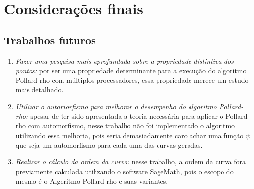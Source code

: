 \chapter{Considerações finais}

\section{Trabalhos futuros}

\begin{enumerate}
	\item \textit{Fazer uma pesquisa mais aprofundada sobre a propriedade distintiva dos pontos:} por ser uma propriedade determinante para a execução do algoritmo Pollard-rho com múltiplos processadores, essa propriedade merece um estudo mais detalhado.
	\item \textit{Utilizar o automorfismo para melhorar o desempenho do algoritmo Pollard-rho:} apesar de ter sido apresentada a teoria necessária para aplicar o Pollard-rho com automorfismo, nesse trabalho não foi implementado o algoritmo utilizando essa melhoria, pois seria demasiadamente caro achar uma função $\psi$ que seja um automorfismo para cada uma das curvas geradas.
	\item \textit{Realizar o cálculo da ordem da curva:} nesse trabalho, a ordem da curva fora previamente calculada utilizando o software SageMath, pois o escopo do mesmo é o Algoritmo Pollard-rho e suas variantes.
\end{enumerate}
